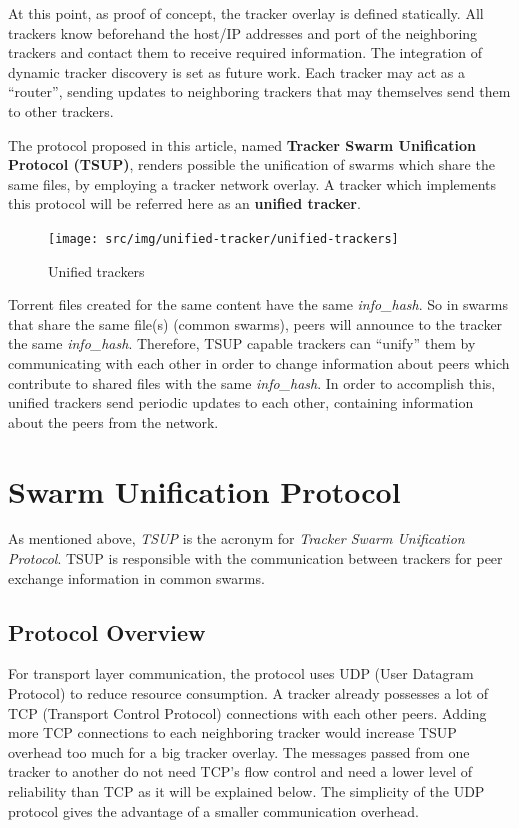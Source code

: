 At this point, as proof of concept, the tracker overlay is defined statically.
All trackers know beforehand the host/IP addresses and port of the neighboring
trackers and contact them to receive required information. The integration of
dynamic tracker discovery is set as future work. Each tracker may act as a
``router'', sending updates to neighboring trackers that may themselves send
them to other trackers.

The protocol proposed in this article, named \textbf{Tracker Swarm Unification
Protocol (TSUP)}, renders possible the unification of swarms which share
the same files, by employing a tracker network overlay. A tracker which
implements this protocol will be referred here as an \textbf{unified tracker}.

\begin{figure}[h]
  \begin{center}
    \texttt{[image: src/img/unified-tracker/unified-trackers]}
  \end{center}
  \caption{Unified trackers}
  \label{fig:unified-tracker:unified-trackers}
\end{figure}

Torrent files created for the same content have the same \textit{info_hash}.
So in swarms that share the same file(s) (common swarms), peers will announce
to the tracker the same \textit{info_hash}. Therefore, TSUP capable trackers
can ``unify'' them by communicating with each other in order to change
information about peers which contribute to shared files with the same
\textit{info_hash}.  In order to accomplish this, unified trackers send
periodic updates to each other, containing information about the peers from
the network.

\section{Swarm Unification Protocol}
\label{sec:unified-tracker:swarm-unification}

As mentioned above, \textit{TSUP} is the acronym for \textit{Tracker Swarm
Unification Protocol}. TSUP is responsible with the communication between
trackers for peer exchange information in common swarms.

\subsection{Protocol Overview}
\label{subsec:unified-tracker:protocol-overview}

For transport layer communication, the protocol uses UDP (User Datagram
Protocol) to reduce resource consumption. A tracker already possesses a lot of
TCP (Transport Control Protocol) connections with each other peers. Adding
more TCP connections to each neighboring tracker would increase TSUP overhead
too much for a big tracker overlay. The messages passed from one tracker to
another do not need TCP's flow control and need a lower level of reliability
than TCP as it will be explained below. The simplicity of the UDP protocol
gives the advantage of a smaller communication overhead.

